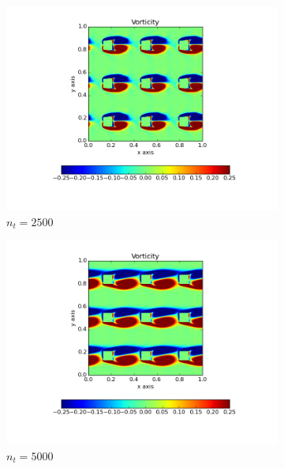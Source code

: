 \documentclass[10pt, a4paper]{article}
\begin{document}
\begin{figure}[htb!]
\centering
\begin{subfigure}{.5\textwidth}
  \centering
  \includegraphics[width=1.1\linewidth, clip=true, trim=1cm 2cm 1cm 1cm]{q4_0001}
  \caption{$n_t = 2500$}
  \label{fig:sub1}
\end{subfigure}%
\begin{subfigure}{.5\textwidth}
  \centering
  \includegraphics[width=1.1\linewidth, clip=true, trim=1cm 2cm 1cm 1cm]{q4_0002}
  \caption{$n_t = 5000$}
  \label{fig:sub2}
\end{subfigure}
\newline
\begin{subfigure}{.5\textwidth}
  \centering

\end{subfigure}
\end{figure}
\end{document}

